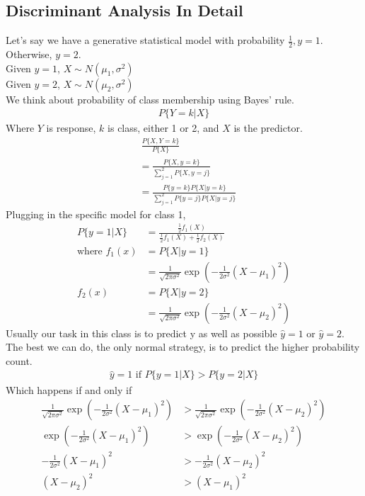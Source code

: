 \documentclass[12pt, letterpaper]{article}
\begin{document}
\subsection{Discriminant Analysis In Detail}
Let's say we have a generative statistical model with probability $\frac 12, y = 1$. Otherwise, $y = 2$. \\
Given $y=1$, $X \sim N(\mu_1,\sigma^2)$ \\
Given $y=2$, $X \sim N(\mu_2, \sigma^2)$\\
We think about probability of class membership using Bayes' rule.
\begin{align*}
    P\{Y=k | X\}
\end{align*}
Where $Y$ is response, $k$ is class, either 1 or 2, and $X$ is the predictor.
\begin{align*}
    &\ \frac {P\{X, Y = k\}}{P\{X\}} \\
    &= \frac{P\{X, y = k\}}{\sum_{j=1}^{2}P\{X,y=j\}} \\
    &= \frac{P\{y=k\}P\{X | y = k\}}{\sum_{j=1}^{2}P\{y=j\}P\{X | y = j\}}
\end{align*}
Plugging in the specific model for class 1,
\begin{align*}
    P\{y = 1 | X\} &= \frac{\frac 12 f_1(X)}{\frac 12 f_1(X) + \frac 12 f_2(X)} \\
    \text{where } f_1(x) &= P\{X | y = 1\} \\
    &= \frac{1}{\sqrt{2\pi \sigma^2}} \exp(-\frac{1}{2\sigma^2}(X-\mu_1)^2) \\
    f_2(x) &= P\{X | y = 2\} \\
    &= \frac{1}{\sqrt{2\pi \sigma^2}} \exp(-\frac{1}{2\sigma^2}(X-\mu_2)^2)
\end{align*}
Usually our task in this class is to predict y as well as possible $\hat y = 1$ or $\hat y = 2$. 
The best we can do, the only normal strategy, is to predict the higher probability count. \\
\begin{align*}
    \hat y = 1 \text{ if } P\{y=1 | X\} > P\{y=2|X\}
\end{align*}
Which happens if and only if
\begin{align*}
    \frac{1}{\sqrt{2\pi \sigma^2}} \exp(-\frac{1}{2\sigma^2}(X-\mu_1)^2) &> \frac{1}{\sqrt{2\pi \sigma^2}} \exp(-\frac{1}{2\sigma^2}(X-\mu_2)^2) \\
    \exp(-\frac{1}{2\sigma^2}(X-\mu_1)^2) &> \exp(-\frac{1}{2\sigma^2}(X-\mu_2)^2) \\
    -\frac{1}{2\sigma^2}(X-\mu_1)^2 &> -\frac{1}{2\sigma^2}(X-\mu_2)^2 \\
    (X-\mu_2)^2 &> (X-\mu_1)^2
\end{align*}
\end{document}
